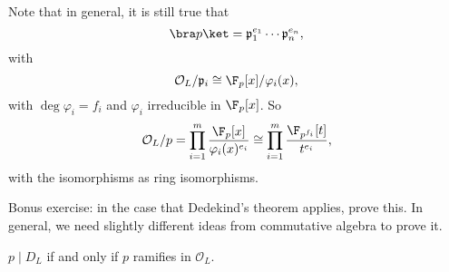 \documentclass[a4paper]{article}
\begin{document}
Note that in general, it is still true that
\[
  \bra p\ket = \mathfrak{p}_1^{e_1} \cdots \mathfrak{p}_n^{e_n},
\]
with
\[
  \mathcal{O}_L/\mathfrak{p}_i \cong \F_p[x] / \varphi_i(x),
\]
with $\deg \varphi_i = f_i$ and $\varphi_i$ irreducible in $\F_p[x]$. So
\[
  \mathcal{O}_L/p = \prod_{i = 1}^m \frac{\F_p[x]}{\varphi_i(x)^{e_i}} \cong \prod_{i = 1}^m \frac{\F_{p^{f_i}}[t]}{t^{e_i}},
\]
with the isomorphisms as ring isomorphisms.

Bonus exercise: in the case that Dedekind's theorem applies, prove this. In general, we need slightly different ideas from commutative algebra to prove it.

\begin{thm}
  $p \mid D_L$ if and only if $p$ ramifies in $\mathcal{O}_L$.
\end{thm}
\end{document}

